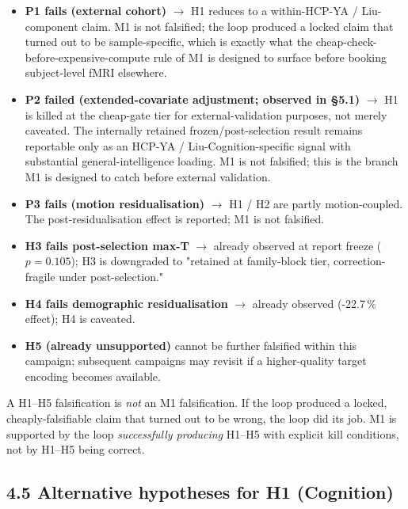 \documentclass[11pt,letterpaper]{report}
\begin{document}
\begin{itemize}[leftmargin=1.6em,itemsep=0.2em]
\item \textbf{P1 fails (external cohort)} $\rightarrow$ H1 reduces to a within-HCP-YA / Liu-component claim. M1 is not falsified; the loop produced a locked claim that turned out to be sample-specific, which is exactly what the cheap-check-before-expensive-compute rule of M1 is designed to surface before booking subject-level fMRI elsewhere.
\item \textbf{P2 failed (extended-covariate adjustment; observed in \S5.1)} $\rightarrow$ H1 is killed at the cheap-gate tier for external-validation purposes, not merely caveated. The internally retained frozen/post-selection result remains reportable only as an HCP-YA / Liu-Cognition-specific signal with substantial general-intelligence loading. M1 is not falsified; this is the branch M1 is designed to catch before external validation.
\item \textbf{P3 fails (motion residualisation)} $\rightarrow$ H1 / H2 are partly motion-coupled. The post-residualisation effect is reported; M1 is not falsified.
\item \textbf{H3 fails post-selection max-T} $\rightarrow$ already observed at report freeze ($p = 0.105$); H3 is downgraded to "retained at family-block tier, correction-fragile under post-selection."
\item \textbf{H4 fails demographic residualisation} $\rightarrow$ already observed (-22.7\,\% effect); H4 is caveated.
\item \textbf{H5 (already unsupported)} cannot be further falsified within this campaign; subsequent campaigns may revisit if a higher-quality target encoding becomes available.
\end{itemize}

A H1--H5 falsification is \emph{not} an M1 falsification. If the loop produced a locked, cheaply-falsifiable claim that turned out to be wrong, the loop did its job. M1 is supported by the loop \emph{successfully producing} H1--H5 with explicit kill conditions, not by H1--H5 being correct.

\subsection*{4.5 Alternative hypotheses for H1 (Cognition)}
\end{document}
